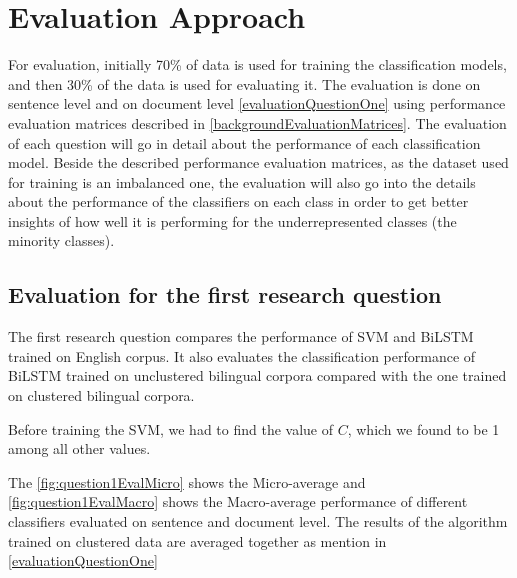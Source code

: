 \section{Evaluation Approach}
For evaluation, initially 70\% of data is used for training the classification models, and then 30\% of the data is used for evaluating it. The evaluation is done on sentence level and on document level \ref{evaluationQuestionOne} using performance evaluation matrices described in \ref{backgroundEvaluationMatrices}. The evaluation of each question will go in detail about the performance of each classification model. Beside the described performance evaluation matrices, as the dataset used for training is an imbalanced one, the evaluation will also go into the details about the performance of the classifiers on each class in order to get better insights of how well it is performing for the underrepresented classes (the minority classes).


\subsection{Evaluation for the first research question} \label{EvalQ1}

The first research question compares the performance of \gls{SVM} and \gls{BiLSTM} trained on English corpus. It also evaluates the classification performance of \gls{BiLSTM} trained on unclustered bilingual corpora compared with the one trained on clustered bilingual corpora.  

Before training the \gls{SVM}, we had to find the value of $C$, which we found to be 1 among all other values.

The \ref{fig:question1EvalMicro} shows the Micro-average and \ref{fig:question1EvalMacro} shows the Macro-average performance of different classifiers evaluated on sentence and document level. The results of the algorithm trained on clustered data are averaged together as mention in \ref{evaluationQuestionOne}

